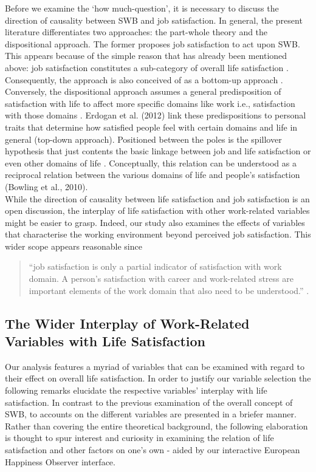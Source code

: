 \documentclass[preprint,12pt,authoryear]{elsarticle}
\begin{document}
	Before we examine the `how much-question', it is necessary to discuss the direction of causality between SWB and job
	satisfaction. In general, the present literature differentiates two approaches: the part-whole theory
	\citep{bowling_meta-analytic_2010,hart_predicting_1999,judge_dispositional_1998} and the dispositional approach. The former
	proposes job satisfaction to act upon SWB. This appears because of the simple reason that has already been mentioned
	above: job satisfaction constitutes a sub-category of overall life satisfaction \citep[cf.]{near_job_1987}.
	Consequently, the approach is also conceived of as a bottom-up approach \citep{erdogan_whistle_2012}. Conversely, the
	dispositional approach assumes a general predisposition of satisfaction with life to affect more specific domains like work
	i.e., satisfaction with those domains \citep{bowling_meta-analytic_2010,diener_subjective_1984,headey_top-down_1991,judge_job_1993,judge_another_1993}. 
	Erdogan et al. (2012) link these predispositions to personal traits that determine how satisfied people feel with certain
	domains and life in general (top-down approach). Positioned between the poles is the spillover hypothesis that just
	contents the basic linkage between job and life satisfaction or even other domains of life 
	\citep{bowling_meta-analytic_2010,erdogan_whistle_2012,judge_job_2001,judge_individual_1994}.
	Conceptually, this relation can be understood as a reciprocal relation between the various domains of life and people’s
	satisfaction (Bowling et al., 2010). \\
	While the direction of causality between life satisfaction and job satisfaction is an open discussion, the interplay of life
	satisfaction with other work-related variables might be easier to grasp. Indeed, our study also examines the effects of
	variables that characterise the working environment beyond perceived job satisfaction. This wider scope appears
	reasonable since 
	\begin{quotation}
	“job satisfaction is only a partial indicator of satisfaction with work domain. A person’s satisfaction with
	career and work-related stress are important elements of the work domain that also need to be understood.” \citep[p. 1042]{erdogan_whistle_2012}.
	\end{quotation}
	
	\subsection{The Wider Interplay of Work-Related Variables with Life Satisfaction}
Our analysis features a myriad of variables that can be examined with regard to their effect on overall life satisfaction.
In order to justify our variable selection the following remarks elucidate the respective variables' interplay with life satisfaction.
In contrast to the previous examination of the overall concept of SWB, to accounts on the different variables are presented 
in a briefer manner. Rather than covering the entire theoretical background, the following elaboration is thought to spur interest
and curiosity in examining the relation of life satisfaction and other factors on one's own - aided by our interactive 
European Happiness Observer interface. 
\end{document}
